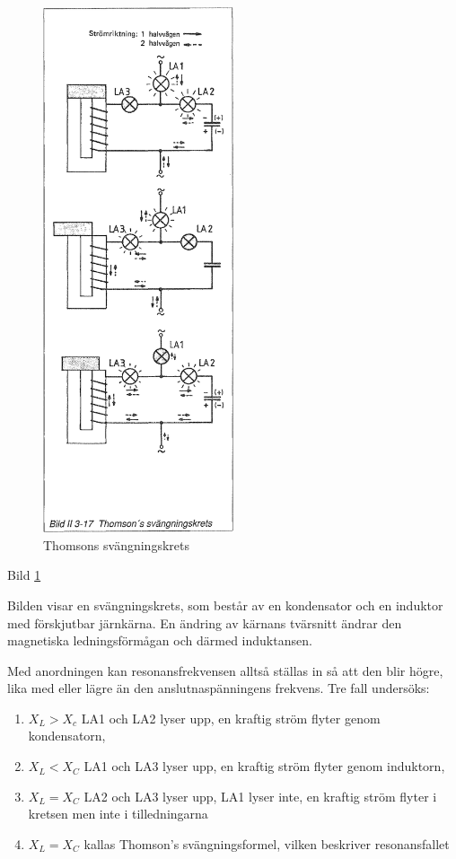 \begin{figure}
\includegraphics[width=0.5\textwidth]{images/bild_2_3-17}
\caption{Thomsons svängningskrets}
\label{fig:BildII3-17}
\end{figure}

Bild \ref{fig:BildII3-17}

Bilden visar en svängningskrets, som består av en kondensator och en induktor
med förskjutbar järnkärna. En ändring av kärnans tvärsnitt ändrar den
magnetiska ledningsförmågan och därmed induktansen.

Med anordningen kan resonansfrekvensen alltså ställas in så att den blir högre,
lika med eller lägre än den anslutnaspänningens frekvens. Tre fall undersöks:
\begin{enumerate}
\item \(X_L > X_c\) LA1 och LA2 lyser upp, en kraftig ström flyter genom
  kondensatorn,
\item \(X_L < X_C\) LA1 och LA3 lyser upp, en kraftig ström flyter genom
  induktorn,
\item \(X_L= X_C\) LA2 och LA3 lyser upp, LA1 lyser inte, en kraftig ström
  flyter i kretsen men inte i tilledningarna
\item \(X_L = X_C\) kallas Thomson's svängningsformel, vilken beskriver
  resonansfallet
\end{enumerate}

